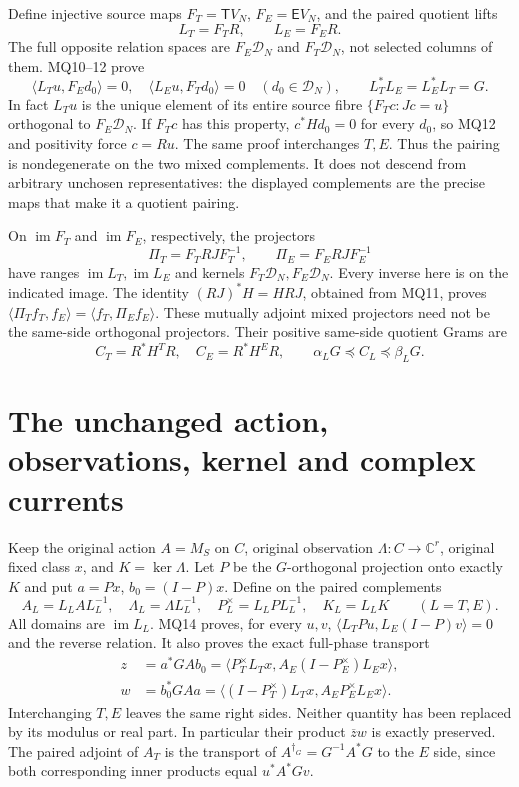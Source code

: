 \documentclass[11pt]{article}
\newcommand{\C}{\mathbb C}
\newcommand{\DD}{\mathcal D}
\newcommand{\TT}{\mathsf T}
\newcommand{\EE}{\mathsf E}
\newcommand{\im}{\operatorname{im}}
\begin{document}
Define injective source maps $F_T=\TT V_N$, $F_E=\EE V_N$,
and the paired quotient lifts
\[
 L_T=F_TR,\qquad L_E=F_ER.                                  \tag{MQ13}
\]
The full opposite relation spaces are $F_E\DD_N$ and
$F_T\DD_N$, not selected columns of them. MQ10--12 prove
\[
 \langle L_Tu,F_Ed_0\rangle=0,
 \quad \langle L_Eu,F_Td_0\rangle=0\quad(d_0\in\DD_N),
 \qquad L_T^*L_E=L_E^*L_T=G.                                \tag{MQ14}
\]
In fact $L_Tu$ is the unique element of its entire source fibre
$\{F_Tc:Jc=u\}$ orthogonal to $F_E\DD_N$. If $F_Tc$ has this
property, $c^*Hd_0=0$ for every $d_0$, so MQ12 and positivity
force $c=Ru$. The same proof interchanges $T,E$. Thus the pairing
is nondegenerate on the two mixed complements. It does not descend
from arbitrary unchosen representatives: the displayed complements
are the precise maps that make it a quotient pairing.

On $\im F_T$ and $\im F_E$, respectively, the projectors
\[
 \Pi_T=F_TRJ F_T^{-1},\qquad \Pi_E=F_ERJ F_E^{-1}             \tag{MQ15}
\]
have ranges $\im L_T,\im L_E$ and kernels $F_T\DD_N,F_E\DD_N$.
Every inverse here is on the indicated image. The identity
$(RJ)^*H=HRJ$, obtained from MQ11, proves
$\langle\Pi_T f_T,f_E\rangle=\langle f_T,\Pi_E f_E\rangle$.
These mutually adjoint mixed projectors need not be the same-side
orthogonal projectors. Their positive same-side quotient Grams are
\[
 C_T=R^*H^TR,\quad C_E=R^*H^ER,\qquad
 \alpha_L G\preceq C_L\preceq\beta_LG.                      \tag{MQ16}
\]

\section{The unchanged action, observations, kernel and complex currents}
Keep the original action $A=M_S$ on $C$, original observation
$\Lambda:C\to\C^r$, original fixed class $x$, and $K=\ker\Lambda$.
Let $P$ be the $G$-orthogonal projection onto exactly $K$ and put
$a=Px$, $b_0=(I-P)x$. Define on the paired complements
\[
 A_L=L_LAL_L^{-1},\quad \Lambda_L=\Lambda L_L^{-1},\quad
 P_L^\times=L_LPL_L^{-1},\quad K_L=L_LK\qquad(L=T,E).
                                                               \tag{MQ17}
\]
All domains are $\im L_L$. MQ14 proves, for every $u,v$,
$\langle L_TPu,L_E(I-P)v\rangle=0$ and the reverse relation.
It also proves the exact full-phase transport
\[
 \begin{split}
 z&=a^*GA b_0
  =\langle P_T^\times L_Tx,A_E(I-P_E^\times)L_Ex\rangle,\\
 w&=b_0^*GA a
  =\langle(I-P_T^\times)L_Tx,A_EP_E^\times L_Ex\rangle.
 \end{split}                                                  \tag{MQ18}
\]
Interchanging $T,E$ leaves the same right sides. Neither quantity
has been replaced by its modulus or real part. In particular their
product $\overline zw$ is exactly preserved. The paired adjoint of
$A_T$ is the transport of $A^{\dagger_G}=G^{-1}A^*G$ to the
$E$ side, since both corresponding inner products equal
$u^*A^*Gv$.
\end{document}
